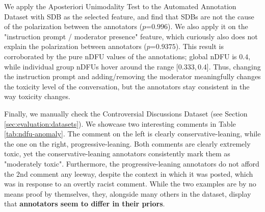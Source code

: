 We apply the Aposteriori Unimodality Test to the Automated Annotation Dataset with \ac{SDB} as the selected feature, and find that \acp{SDB} are not the cause of the polarization between the annotators ($p\text{=}0.996$). We also apply it on the "instruction prompt / moderator presence" feature, which curiously also does not explain the polarization between annotators ($p\text{=}0.9375$). This result is corroborated by the pure \ac{nDFU} values of the annotations; global \ac{nDFU} is $0.4$, while individual group \acp{nDFU} hover around the range [$0.333, 0.4$]. Thus, changing the instruction prompt and adding/removing the moderator meaningfully changes the toxicity level of the conversation, but the annotators stay consistent in the way toxicity changes.

Finally, we manually check the Controversial Discussions Dataset (see Section \ref{sec:evaluation:datasets}). We showcase two interesting comments in Table \ref{tab:ndfu-anomaly}. The comment on the left is clearly conservative-leaning, while the one on the right, progressive-leaning. Both comments are clearly extremely toxic, yet the conservative-leaning annotators consistently mark them as "moderately toxic". Furthermore, the progressive-leaning annotators do not afford the 2nd comment any leeway, despite the context in which it was posted, which was in response to an overtly racist comment. While the two examples are by no means proof by themselves, they, alongside many others in the dataset, display that \textbf{annotators seem to differ in their priors}.

